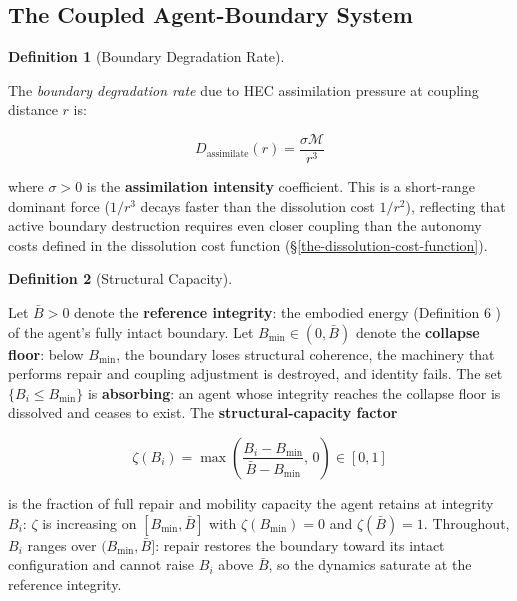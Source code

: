 \documentclass[11pt]{article}
\theoremstyle{plain}
\theoremstyle{definition}
\newtheorem{definition}{Definition}
\theoremstyle{remark}
\let\origsubsection\subsection
\renewcommand{\subsection}{\needspace{7\baselineskip}\origsubsection}
\begin{document}
\subsection{The Coupled Agent-Boundary
System}\label{the-coupled-agent-boundary-system}

\begin{definition}[Boundary Degradation Rate]
\label{def-boundary-degradation-rate}

The \emph{boundary degradation rate} due to HEC assimilation pressure at coupling distance $r$ is:

$$D_{\text{assimilate}}(r) = \frac{\sigma \mathcal{M}}{r^3}$$

where $\sigma > 0$ is the \textbf{assimilation intensity} coefficient. This is a short-range dominant force ($1/r^3$ decays faster than the dissolution cost $1/r^2$), reflecting that active boundary destruction requires even closer coupling than the autonomy costs defined in the dissolution cost function (§\ref{the-dissolution-cost-function}).
\end{definition}

\begin{definition}[Structural Capacity]
\label{def-structural-capacity}

Let $\bar{B} > 0$ denote the \textbf{reference integrity}: the embodied energy (Definition 6 \citep{TC-IV}) of the agent's fully intact boundary. Let $B_{\min} \in (0, \bar{B})$ denote the \textbf{collapse floor}: below $B_{\min}$, the boundary loses structural coherence, the machinery that performs repair and coupling adjustment is destroyed, and identity fails. The set $\{B_i \leq B_{\min}\}$ is \textbf{absorbing}: an agent whose integrity reaches the collapse floor is dissolved and ceases to exist. The \textbf{structural-capacity factor}

$$\zeta(B_i) = \max\left(\frac{B_i - B_{\min}}{\bar{B} - B_{\min}},\, 0\right) \in [0, 1]$$

is the fraction of full repair and mobility capacity the agent retains at integrity $B_i$: $\zeta$ is increasing on $[B_{\min}, \bar{B}]$ with $\zeta(B_{\min}) = 0$ and $\zeta(\bar{B}) = 1$. Throughout, $B_i$ ranges over $(B_{\min}, \bar{B}]$: repair restores the boundary toward its intact configuration and cannot raise $B_i$ above $\bar{B}$, so the dynamics saturate at the reference integrity.
\end{definition}
\end{document}
